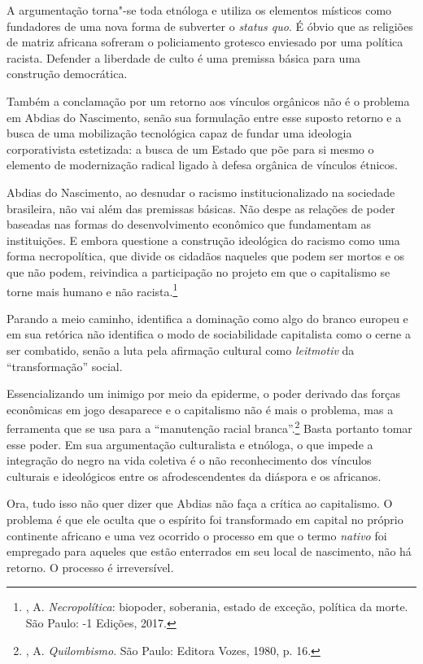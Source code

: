 A argumentação torna"-se toda etnóloga e utiliza os elementos místicos
como fundadores de uma nova forma de subverter o \emph{status quo}. É
óbvio que as religiões de matriz africana sofreram o policiamento
grotesco enviesado por uma política racista. Defender a liberdade de
culto é uma premissa básica para uma construção democrática.

Também a conclamação por um retorno aos vínculos orgânicos não é o
problema em Abdias do Nascimento, senão sua formulação entre esse
suposto retorno e a busca de uma mobilização tecnológica capaz de fundar
uma ideologia corporativista estetizada: a busca de um Estado que põe
para si mesmo o elemento de modernização radical ligado à defesa
orgânica de vínculos étnicos.

Abdias do Nascimento, ao desnudar o racismo institucionalizado na
sociedade brasileira, não vai além das premissas básicas. Não despe as
relações de poder baseadas nas formas do desenvolvimento econômico que
fundamentam as instituições. E embora questione a construção ideológica
do racismo como uma forma necropolítica, que divide os cidadãos naqueles
que podem ser mortos e os que não podem, reivindica a participação no
projeto em que o capitalismo se torne mais humano e não
racista.\footnote{, A. \emph{Necropolítica}: biopoder, soberania,
  estado de exceção, política da morte. São Paulo: -1 Edições, 2017.}

Parando a meio caminho, identifica a dominação como algo do branco
europeu e em sua retórica não identifica o modo de sociabilidade
capitalista como o cerne a ser combatido, senão a luta pela afirmação
cultural como \emph{leitmotiv} da ``transformação'' social.

Essencializando um inimigo por meio da epiderme, o poder derivado das
forças econômicas em jogo desaparece e o capitalismo não é mais o
problema, mas a ferramenta que se usa para a ``manutenção racial
branca''.\footnote{, A. \emph{Quilombismo}. São Paulo: Editora
  Vozes, 1980, p. 16.} Basta portanto tomar esse poder. Em sua
argumentação culturalista e etnóloga, o que impede a integração do negro
na vida coletiva é o não reconhecimento dos vínculos culturais e
ideológicos entre os afrodescendentes da diáspora e os africanos.

Ora, tudo isso não quer dizer que Abdias não faça a crítica ao
capitalismo. O problema é que ele oculta que o espírito foi transformado
em capital no próprio continente africano e uma vez ocorrido o processo
em que o termo \emph{nativo} foi empregado para aqueles que estão
enterrados em seu local de nascimento, não há retorno. O processo é
irreversível.

